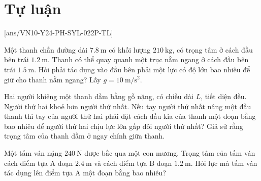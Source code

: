 \section{Tự luận}
\setcounter{ex}{0}
[ans/VN10-Y24-PH-SYL-022P-TL]
\begin{ex}
	Một thanh chắn đường dài $\SI{7.8}{\meter}$ có khối lượng $\SI{210}{\kilogram}$, có trọng tâm ở cách đầu bên trái $\SI{1.2}{\meter}$. Thanh có thể quay quanh một trục nằm ngang ở cách đầu bên trái $\SI{1.5}{\meter}$. Hỏi phải tác dụng vào đầu bên phải một lực có độ lớn bao nhiêu để giữ cho thanh nằm ngang? Lấy $g=\SI{10}{\meter/\second^2}$.
\end{ex}
\begin{ex}
	Hai người khiêng một thanh dầm bằng gỗ nặng, có chiều dài $L$, tiết diện đều. Người thứ hai khoẻ hơn người thứ nhất. Nếu tay người thứ nhất nâng một đầu thanh thì tay của người thứ hai phải đặt cách đầu kia của thanh một đoạn bằng bao nhiêu để người thứ hai chịu lực lớn gấp đôi người thứ nhất? Giả sử rằng trọng tâm của thanh dầm ở ngay chính giữa thanh.
\end{ex}
\begin{ex}
	Một tấm ván nặng $\SI{240}{\newton}$ được bắc qua một con mương. Trọng tâm của tấm ván cách điểm tựa A đoạn $\SI{2.4}{\meter}$ và cách điểm tựa B đoạn $\SI{1.2}{\meter}$. Hỏi lực mà tấm ván tác dụng lên điểm tựa A một đoạn bằng bao nhiêu?
\end{ex}
